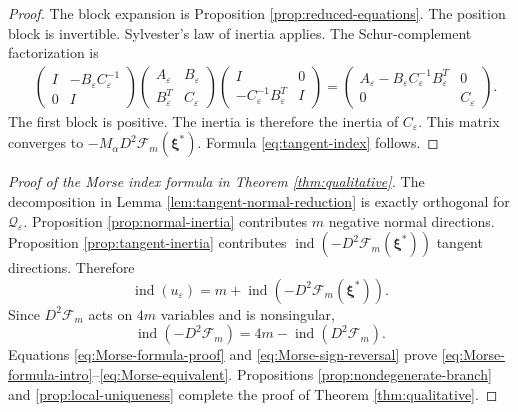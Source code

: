 \documentclass[11pt]{article}
\numberwithin{equation}{section}
\begin{document}
\begin{proof}
The block expansion is Proposition \ref{prop:reduced-equations}. The position block is invertible. Sylvester's law of inertia applies. The Schur-complement factorization is
\[
\begin{aligned}
&\begin{pmatrix}I&-B_\varepsilon C_\varepsilon^{-1}\\0&I\end{pmatrix}
\begin{pmatrix}A_\varepsilon&B_\varepsilon\\B_\varepsilon^T&C_\varepsilon\end{pmatrix}
\begin{pmatrix}I&0\\-C_\varepsilon^{-1}B_\varepsilon^T&I\end{pmatrix} =\begin{pmatrix}
A_\varepsilon-B_\varepsilon C_\varepsilon^{-1}B_\varepsilon^T&0\\0&C_\varepsilon
\end{pmatrix}.
\end{aligned}
\]
The first block is positive. The inertia is therefore the inertia of
$C_\varepsilon$. This matrix converges to
$-M_\alpha D^2\mathcal F_m(\boldsymbol\xi^*)$. Formula
\eqref{eq:tangent-index} follows.
\end{proof}

\begin{proof}[Proof of the Morse index formula in Theorem \ref{thm:qualitative}]
The decomposition in Lemma \ref{lem:tangent-normal-reduction} is
exactly orthogonal for $\mathcal Q_\varepsilon$. Proposition
\ref{prop:normal-inertia} contributes $m$ negative normal
directions. Proposition \ref{prop:tangent-inertia} contributes
$\operatorname{ind}(-D^2\mathcal F_m(\boldsymbol\xi^*))$ tangent
directions. Therefore
\begin{equation}\label{eq:Morse-formula-proof}
\operatorname{ind}(u_\varepsilon)
=m+\operatorname{ind}
(-D^2\mathcal F_m(\boldsymbol\xi^*)).
\end{equation}
Since $D^2\mathcal F_m$ acts on $4m$ variables and is nonsingular,
\begin{equation}\label{eq:Morse-sign-reversal}
\operatorname{ind}(-D^2\mathcal F_m)
=4m-\operatorname{ind}(D^2\mathcal F_m).
\end{equation}
Equations \eqref{eq:Morse-formula-proof} and
\eqref{eq:Morse-sign-reversal} prove
\eqref{eq:Morse-formula-intro}--\eqref{eq:Morse-equivalent}.
Propositions \ref{prop:nondegenerate-branch} and
\ref{prop:local-uniqueness} complete the proof of Theorem
\ref{thm:qualitative}.
\end{proof}
\end{document}

